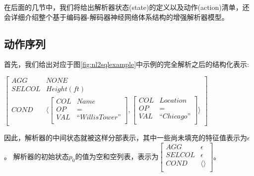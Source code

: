 在后面的几节中，我们将给出解析器状态(state)的定义以及动作(action)清单，还会详细介绍整个基于编码器-解码器神经网络体系结构的增强解析器模型。


\subsection{动作序列}
\label{enl2sql:dzxl}

首先，我们给出对应于图\ref{fig:nl2sqlexample}中示例的完全解析之后的结构化表示:
  

$\begin{bmatrix}
  AGG    &  NONE  \\
  SELCOL &  Height(ft) \\
  COND   &   \langle
    \begin{bmatrix}
      COL  &  Name \\
      OP   &  =    \\
      VAL  &  “Willis Tower”\\
    \end{bmatrix}
    ,
    \begin{bmatrix}
      COL  &  Location \\
      OP   &  =    \\
      VAL  &  “Chicago”\\
    \end{bmatrix}
    \rangle
  \end{bmatrix}$

因此，解析器的中间状态就被这样分部表示，其中一些尚未填充的特征值表示为$\epsilon$。
解析器的初始状态$p_{0}$的值为空和空列表，表示为$\begin{bmatrix}
  AGG    &  \epsilon  \\
  SELCOL &  \epsilon \\
  COND   &   \langle \rangle\\
  \end{bmatrix}$。

